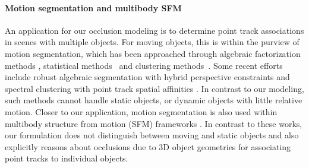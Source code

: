 

\vspace{-0.3cm}
\paragraph{Motion segmentation and multibody SFM}
An application for our occlusion modeling is to determine point track associations in scenes with multiple objects. For moving objects, this is within the purview of motion segmentation, which has been approached through algebraic factorization methods \cite{Costeria98,Vidal03,Vidal04}, statistical methods~\cite{Kanatani01,Gruber04,Rao08} and clustering methods~\cite{Yan06,Goh07}. Some recent efforts include robust algebraic segmentation with hybrid perspective constraints \cite{Rao_etal_2010} and spectral clustering with point track spatial affinities \cite{Brox_Malik_2010}. In contrast to our modeling, such methods cannot handle static objects, or dynamic objects with little relative motion.
Closer to our application, motion segmentation is also used within multibody structure from motion (SFM) frameworks \cite{Ozden_etal_2010,Kundu_etal_2011,Namdev2012}. In contrast to these works, our formulation does not distinguish between moving and static objects and also explicitly reasons about occlusions due to 3D object geometries for associating point tracks to individual objects.


